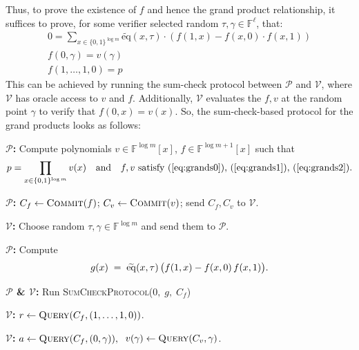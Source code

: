 \documentclass[../lecture-notes-148x210.tex]{subfiles}
\begin{document}
Thus, to prove the existence of $f$ and hence the grand product relationship, it suffices
to prove, for some verifier selected random $\tau, \gamma \in \mathbb{F}^\ell$, that:
\begin{gather}
\label{eq:grands0}
    0 = \sum_{x \in \{0,1\}^{\log m}} \widetilde{\text{eq}}(x, \tau) \cdot (f(1,x) - f(x, 0) \cdot f(x, 1))\\
\label{eq:grands1}
    f(0, \gamma) = v(\gamma)\\
\label{eq:grands2}
    f(1,\dots,1, 0) = p
\end{gather}
This can be achieved by running the sum-check protocol between $\mathcal{P}$ and $\mathcal{V}$, where $\mathcal{V}$ 
has oracle access to $v$ and $f$. Additionally, $\mathcal{V}$ evaluates the $f, v$ at the random point $\gamma$ to 
verify that $f(0, x) = v(x)$. So, the sum-check-based protocol for the grand products looks as follows:
\newline
\begin{algorithm}[H]
\caption{Sum-Check-based Protocol for Grand Products}\label{alg:sum_check_grand_product}
\DontPrintSemicolon
\SetAlgoLined

\textbf{$\mathcal P$:}
Compute polynomials 
$v\in\mathbb{F}^{\log m}[x]$, 
$f\in\mathbb{F}^{\log m+1}[x]$ 
such that
\vspace{-0.8em}
\begin{equation*}
    \vspace{-1.6em}
    p = \prod_{x\in\{0,1\}^{\log m}} v(x)
    \quad\text{and}\quad
    f, v \text{ satisfy }(\ref{eq:grands0}),\,(\ref{eq:grands1}),\,(\ref{eq:grands2}).
\end{equation*}\;

\textbf{$\mathcal P$:}
$C_f \leftarrow \textsc{Commit}(f)$;
$C_v \leftarrow \textsc{Commit}(v)$;
send $C_f, C_v$ to $\mathcal V$.\;

\textbf{$\mathcal V$:}
Choose random $\tau,\gamma\in\mathbb{F}^{\log m}$ and send them to $\mathcal P$.\;

\textbf{$\mathcal P$:}
Compute
\vspace{-0.8em}
\begin{equation*}
    \vspace{-1.6em}
    g(x)\;=\;\widetilde{\mathrm{eq}}(x,\tau)\,\bigl(f(1,x)-f(x,0)\,f(x,1)\bigr).
\end{equation*}\;

\textbf{$\mathcal P$ \& $\mathcal V$:}
Run \textsc{SumCheckProtocol}($0,\;g,\;C_f$)


\textbf{$\mathcal V$:}
$r \leftarrow \textsc{Query}(C_f,(1,\dots,1,0))$.\;

\textbf{$\mathcal V$:}
$a \leftarrow \textsc{Query}(C_f,(0,\gamma)), \;$ $v(\gamma)\leftarrow \textsc{Query}(C_v,\gamma)$.\;
\end{algorithm}
\end{document}
